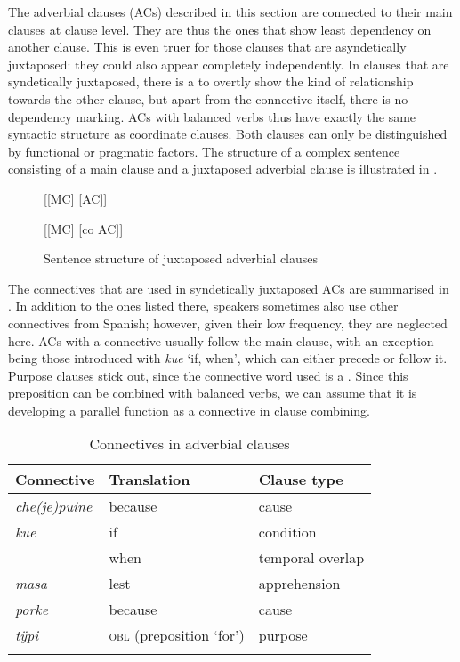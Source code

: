 The adverbial clauses (ACs) described in this section are connected to their main clauses at clause level. They are thus the ones that show least dependency on another clause. This is even truer for those clauses that are asyndetically juxtaposed: they could also appear completely independently. In clauses that are syndetically juxtaposed, there is a  to overtly show the kind of relationship towards the other clause, but apart from the connective itself, there is no dependency marking. ACs with balanced verbs thus have exactly the same syntactic structure as coordinate clauses. Both clauses can only be distinguished by functional or pragmatic factors. The structure of a complex sentence consisting of a main clause and a juxtaposed adverbial clause is illustrated in . 

\begin{figure}[!ht]


[[MC] [AC]]

[[MC] [co AC]]
\caption{Sentence structure of juxtaposed adverbial clauses}
\label{fig:JuxtaposedACStructure}

\end{figure}


The connectives that are used in syndetically juxtaposed ACs are summarised in . In addition to the ones listed there, speakers sometimes also use other connectives from Spanish; however, given their low frequency, they are neglected here. ACs with a connective usually follow the main clause, with an exception being those introduced with \textit{kue} ‘if, when’, which can either precede or follow it. Purpose clauses stick out, since the connective word used is a . Since this preposition can be combined with balanced verbs, we can assume that it is developing a parallel function as a connective in clause combining.

\begin{table}
\caption{Connectives in adverbial clauses}

\begin{tabularx}{\textwidth}{QQQ}
\lsptoprule
Connective & Translation & Clause type \\
\midrule
\textit{che(je)puine} & because & cause\\
\textit{kue} & if & condition\\
& when & temporal overlap\\
\textit{masa} & lest & apprehension\\
\textit{porke} & because & cause\\
\textit{tÿpi} & \textsc{obl} (preposition ‘for’) & purpose \\
\lspbottomrule
\end{tabularx}

\label{table:Connectives_AC}
\end{table}


